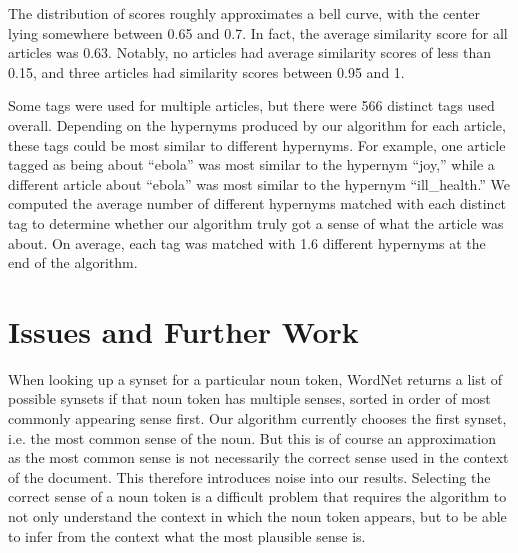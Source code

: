 \documentclass[12pt]{article}
\begin{document}
The distribution of scores roughly approximates a bell curve, with the center lying somewhere between 0.65 and 0.7. In fact, the average similarity score for all articles was 0.63. Notably, no articles had average similarity scores of less than 0.15, and three articles had similarity scores between 0.95 and 1.

Some tags were used for multiple articles, but there were 566 distinct tags used overall. Depending on the hypernyms produced by our algorithm for each article, these tags could be most similar to different hypernyms. For example, one article tagged as being about ``ebola'' was most similar to the hypernym ``joy,'' while a different article about ``ebola'' was most similar to the hypernym ``ill\_health.'' We computed the average number of different hypernyms matched with each distinct tag to determine whether our algorithm truly got a sense of what the article was about. On average, each tag was matched with 1.6 different hypernyms at the end of the algorithm.

\section{Issues and Further Work}

When looking up a synset for a particular noun token, WordNet returns a list of possible synsets if that noun token has multiple senses, sorted in order of most commonly appearing sense first. Our algorithm currently chooses the first synset, i.e. the most common sense of the noun. But this is of course an approximation as the most common sense is not necessarily the correct sense used in the context of the document. This therefore introduces noise into our results. Selecting the correct sense of a noun token is a difficult problem that requires the algorithm to not only understand the context in which the noun token appears, but to be able to infer from the context what the most plausible sense is.



%
%


\end{document}
